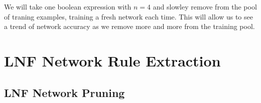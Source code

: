 \documentclass{article}
\theoremstyle{definition}
\begin{document}
We will take one boolean expression with $n = 4$ and slowley remove from the pool of traning examples, training a fresh network each time. This will allow us to see a trend of network accuracy as we remove more and more from the training pool.

\section{LNF Network Rule Extraction}

\subsection{LNF Network Pruning}


\medskip


\end{document}
